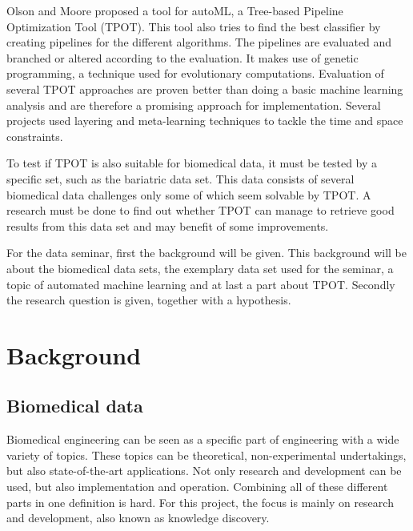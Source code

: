 \documentclass[10pt,a4paper]{article}
\begin{document}
	Olson and Moore proposed a tool for autoML, a Tree-based Pipeline Optimization Tool (TPOT). \cite{olson2016tpot} This tool also tries to find the best classifier by creating pipelines for the different algorithms. The pipelines are evaluated and branched or altered according to the evaluation. It makes use of genetic programming, a technique used for evolutionary computations. \cite{banzhaf1998genetic} Evaluation of several TPOT approaches are proven better than doing a basic machine learning analysis and are therefore a promising approach for implementation. \cite{olson2016evaluation} Several projects used layering and meta-learning techniques to tackle the time and space constraints. \cite{Gijsbers2017Thesis}
	
	To test if TPOT is also suitable for biomedical data, it must be tested by a specific set, such as the bariatric data set. This data consists of several biomedical data challenges only some of which seem solvable by TPOT. A research must be done to find out whether TPOT can manage to retrieve good results from this data set and may benefit of some improvements.
	
	For the data seminar, first the background will be given. This background will be about the biomedical data sets, the exemplary data set used for the seminar, a topic of automated machine learning and at last a part about TPOT. Secondly the research question is given, together with a hypothesis.
	
	\section{Background}
	\label{sec:Background}
	
	\subsection{Biomedical data}
	
	\label{subsec:BiomedicalData}
	
	Biomedical engineering can be seen as a specific part of engineering with a wide variety of topics. These topics can be theoretical, non-experimental undertakings, but also state-of-the-art applications. Not only research and development can be used, but also implementation and operation. Combining all of these different parts in one definition is hard. \cite{bronzino2014biomedical} For this project, the focus is mainly on research and development, also known as knowledge discovery. \cite{bramer2007principles} 
\end{document}
